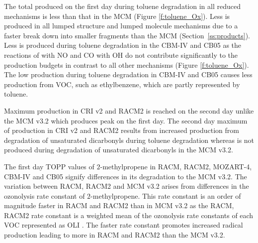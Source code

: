 The total  produced on the first day during toluene degradation in all reduced mechanisms is less than that in the MCM (Figure \ref{f:toluene_Ox}).
Less  is produced in all lumped structure and lumped molecule mechanisms due to a faster break down into smaller fragments than the MCM \mbox{(Section \ref{ss:products})}.
Less  is produced during toluene degradation in the CBM-IV and CB05 as the reactions of  with NO and CO with OH do not contribute significantly to the  production budgets in contrast to all other mechanisms (Figure \ref{f:toluene_Ox}).
The low  production during toluene degradation in CBM-IV and CB05 causes less  production from VOC, such as ethylbenzene, which are partly represented by toluene.

Maximum  production in CRI v2 and RACM2 is reached on the second day unlike the MCM v3.2 which produces peak  on the first day.
The second day maximum of  production in CRI v2 and RACM2 results from increased  production from degradation of unsaturated dicarbonyls during toluene degradation whereas  is not produced during degradation of unsaturated dicarbonyls in the MCM v3.2.

%

The first day TOPP values of $2$-methylpropene in RACM, RACM2, MOZART-4, CBM-IV and CB05 signify differences in its degradation to the MCM v3.2.
The variation between RACM, RACM2 and MCM v3.2 arises from differences in the ozonolysis rate constant of $2$-methylpropene.
This rate constant is an order of magnitude faster in RACM and RACM2 than in MCM v3.2 as the RACM, RACM2 rate constant is a weighted mean of the ozonolysis rate constants of each VOC represented as OLI \citep{Stockwell:1997, Goliff:2013}.
The faster rate constant promotes increased radical production leading to more  in RACM and RACM2 than the MCM v3.2.

